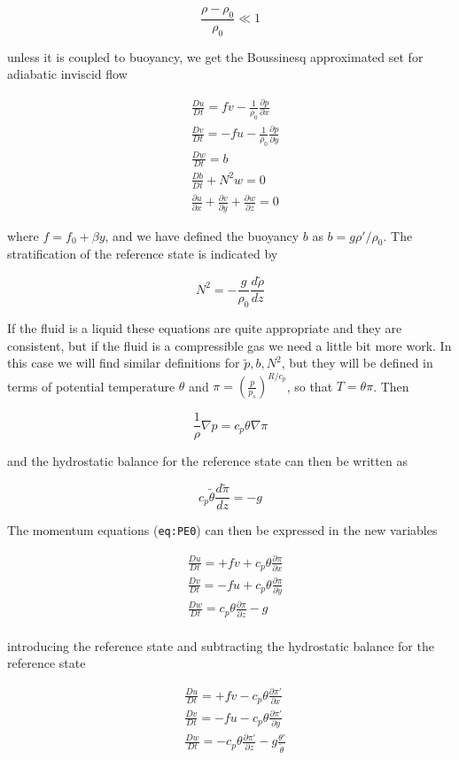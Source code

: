 \[\frac{\rho-\rho_0}{\rho_0} \ll 1\]

unless it is coupled to buoyancy, we get the Boussinesq approximated set
for adiabatic inviscid flow

\[\begin{aligned}
&\frac{D u}{Dt} =    f v -\frac{1}{\rho_0}\frac{\partial p}{\partial x}  \\ 
&\frac{D v}{Dt} =  -  f u -\frac{1}{\rho_0}\frac{\partial p}{\partial y} \label{eq:PE1} \\
&\frac{D w}{Dt} =  b \\
&\frac{D b}{Dt} + N^2 w = 0 \\
&\frac{\partial  u}{\partial x}+\frac{\partial  v}{\partial y}+\frac{\partial w}{\partial z} =0
\end{aligned}\]

where \(f=f_0 +\beta y\), and we have defined the buoyancy \(b\) as
\(b=g\rho'/\rho_0\). The stratification of the reference state is
indicated by

\[N^2 = -\frac{g}{\rho_0}\frac{d \tilde{\rho}}{dz}\]

If the fluid is a liquid these equations are quite appropriate and they
are consistent, but if the fluid is a compressible gas we need a little
bit more work. In this case we will find similar definitions for
\(\tilde{p}, b , N^2\), but they will be defined in terms of potential
temperature \(\theta\) and \(\pi =(\frac{p}{p_s})^{R/c_p}\), so that
\(T=\theta \pi\). Then

\[\frac{1}{\rho}\nabla p = c_p \theta \nabla\pi\]

and the hydrostatic balance for the reference state can then be written
as

\[c_p\tilde{\theta}\frac{d \tilde{\pi}}{dz} = -g\]

The momentum equations (\texttt{eq:PE0}) can then be expressed in the
new variables

{\[\begin{aligned}
&\frac{D u}{Dt} =  +  f v +c_p\theta\frac{\partial \pi}{\partial x}  \\ 
&\frac{D v}{Dt} =  -  f u +c_p\theta\frac{\partial \pi}{\partial y}  \\
&\frac{D w}{Dt} =  c_p\theta\frac{\partial \pi}{\partial z} -g\\
\end{aligned}\]}

introducing the reference state and subtracting the hydrostatic balance
for the reference state

{\[\begin{aligned}
&\frac{D u}{Dt} =  +  f v -c_p\theta\frac{\partial \pi'}{\partial x}  \\ 
&\frac{D v}{Dt} =  -  f u -c_p\theta\frac{\partial \pi'}{\partial y}  \\
&\frac{D w}{Dt} =  -c_p\theta\frac{\partial \pi'}{\partial z} -g\frac{\theta'}{\tilde{\theta}}\\
\end{aligned}\]}

